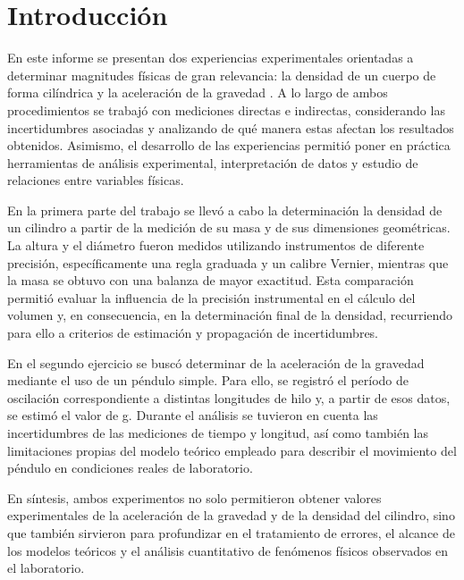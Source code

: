 \section{Introducción}

En este informe se presentan dos experiencias experimentales orientadas a determinar magnitudes físicas de gran relevancia: la densidad de un cuerpo de forma cilíndrica y la aceleración de la gravedad . A lo largo de ambos procedimientos se trabajó con mediciones directas e indirectas, considerando las incertidumbres asociadas y analizando de qué manera estas afectan los resultados obtenidos. Asimismo, el desarrollo de las experiencias permitió poner en práctica herramientas de análisis experimental, interpretación de datos y estudio de relaciones entre variables físicas.

En la primera parte del trabajo se llevó a cabo la determinación la densidad de un cilindro a partir de la medición de su masa y de sus dimensiones geométricas. La altura y el diámetro fueron medidos utilizando instrumentos de diferente precisión, específicamente una regla graduada y un calibre Vernier, mientras que la masa se obtuvo con una balanza de mayor exactitud. Esta comparación permitió evaluar la influencia de la precisión instrumental en el cálculo del volumen y, en consecuencia, en la determinación final de la densidad, recurriendo para ello a criterios de estimación y propagación de incertidumbres.

En el segundo ejercicio se buscó determinar de la aceleración de la gravedad mediante el uso de un péndulo simple. Para ello, se registró el período de oscilación correspondiente a distintas longitudes de hilo y, a partir de esos datos, se estimó el valor de g. Durante el análisis se tuvieron en cuenta las incertidumbres de las mediciones de tiempo y longitud, así como también las limitaciones propias del modelo teórico empleado para describir el movimiento del péndulo en condiciones reales de laboratorio.

En síntesis, ambos experimentos no solo permitieron obtener valores experimentales de la aceleración de la gravedad y de la densidad del cilindro, sino que también sirvieron para profundizar en el tratamiento de errores, el alcance de los modelos teóricos y el análisis cuantitativo de fenómenos físicos observados en el laboratorio.